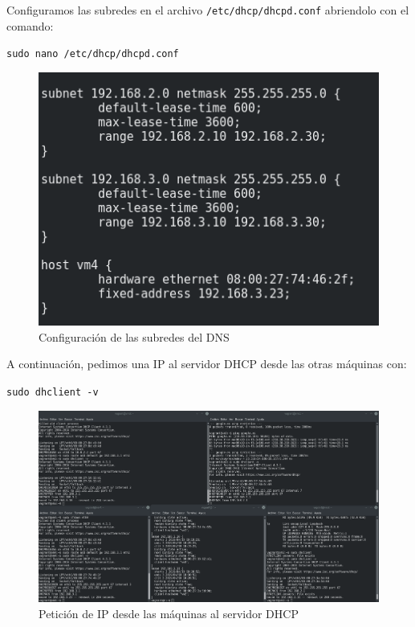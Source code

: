 \documentclass[12pt,letterpaper]{article}
\begin{document}
\newpage
Configuramos las subredes en el archivo \texttt{/etc/dhcp/dhcpd.conf} abriendolo con el comando:
\begin{center}
	\texttt{sudo nano /etc/dhcp/dhcpd.conf}
\end{center}
\begin{figure}[h]
	\centering
	\includegraphics[scale=0.8]{DHCP2.png}
	\caption{Configuración de las subredes del DNS}
\end{figure}

A continuación, pedimos una IP al servidor DHCP desde las otras máquinas con:
\begin{center}
	\texttt{sudo dhclient -v}
\end{center}
\newpage
\begin{figure}[h]
	\centering
	\includegraphics[scale=0.25]{DHCP1.png}
	\caption{Petición de IP desde las máquinas al servidor DHCP}
\end{figure}
\end{document}
